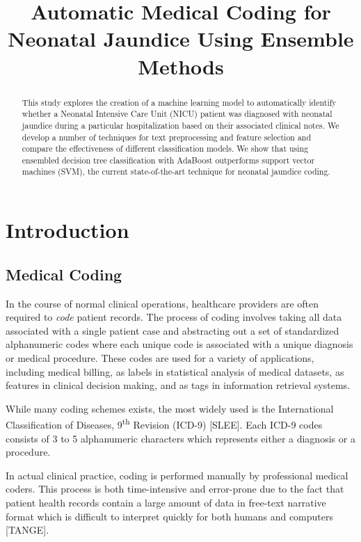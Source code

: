 \documentclass[conference]{IEEEtran}
\begin{document}
\title{Automatic Medical Coding for Neonatal Jaundice Using Ensemble Methods
}


\author{
}

\maketitle

\begin{abstract}
This study explores the creation of a machine learning model to automatically identify whether a Neonatal Intensive Care Unit (NICU) patient was diagnosed with neonatal jaundice during a particular hospitalization based on their associated clinical notes. We develop a number of techniques for text preprocessing and feature selection and compare the effectiveness of different classification models. We show that using ensembled decision tree classification with AdaBoost outperforms support vector machines (SVM), the current state-of-the-art technique for neonatal jaundice coding.
\end{abstract}

\section{Introduction}
\subsection{Medical Coding}\label{AA}
In the course of normal clinical operations, healthcare providers are often required to \textit{code} patient records. The process of coding involves taking all data associated with a single patient case and abstracting out a set of standardized alphanumeric codes where each unique code is associated with a unique diagnosis or medical procedure. These codes are used for a variety of applications, including medical billing, as labels in statistical analysis of medical datasets, as features in clinical decision making, and as tags in information retrieval systems. 

While many coding schemes exists, the most widely used is the International Classification of Diseases, 9\textsuperscript{th} Revision (ICD-9) [SLEE]. Each ICD-9 codes consists of 3 to 5 alphanumeric characters which represents either a diagnosis or a procedure.

In actual clinical practice, coding is performed manually by professional medical coders. This process is both time-intensive and error-prone due to the fact that patient health records contain a large amount of data in free-text narrative format which is difficult to interpret quickly for both humans and computers [TANGE]. 
\end{document}
